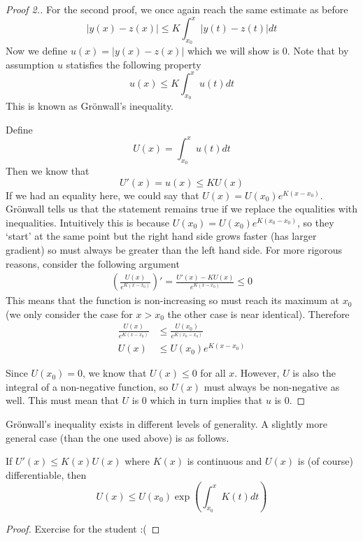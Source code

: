 \begin{proof}[Proof 2.]
    For the second proof, we once again reach the same estimate as before
    $$ |y(x) - z(x)| \leq K \int_{x_0}^{x} |y(t) - z(t)| dt $$
    Now we define $u(x) = |y(x) - z(x)|$ which we will show is 0. Note that by assumption $u$ statisfies the following property
    $$ u(x) \leq K \int_{x_0}^{x} u(t)dt $$
    This is known as Grönwall's inequality.
    
    Define 
    $$ U(x) = \int_{x_0}^{x} u(t) dt $$
    Then we know that
    $$ U'(x) = u(x) \leq KU(x)$$
    If we had an equality here, we could say that $U(x) = U(x_0) e^{K(x - x_0)}$. Grönwall tells us that the statement remains true if we replace the equalities with inequalities. Intuitively this is because $U(x_0) = U(x_0)e^{K(x_0 - x_0)}$, so they `start' at the same point but the right hand side grows faster (has larger gradient) so must always be greater than the left hand side. For more rigorous reasons, consider the following argument
\begin{align*}
    \left( \frac{U(x)}{e^{K(x - x_0)}} \right)' = \frac{U'(x) - K U(x)}{e^{K(x - x_0)}} \leq 0
\end{align*}
    This means that the function is non-increasing so must reach its maximum at $x_0$ (we only consider the case for $x > x_0$ the other case is near identical). Therefore
    \begin{align*}
        \frac{U(x)}{e^{K(x - x_0)}} &\leq \frac{U(x_0)}{e^{K(x_0 - x_0)}}\\
        U(x) &\leq U(x_0) e^{K(x - x_0)}
    \end{align*}
    
    Since $U(x_0) = 0$, we know that $U(x) \leq 0$ for all $x$. However, $U$ is also the integral of a non-negative function, so $U(x)$ must always be non-negative as well. This must mean that $U$ is 0 which in turn implies that $u$ is 0.
\end{proof}

Grönwall's inequality exists in different levels of generality. A slightly more general case (than the one used above) is as follows.
\begin{theorem}\label{thm:easy-gronwall}
If $U'(x) \leq K(x) U(x)$ where $K(x)$ is continuous and $U(x)$ is (of course) differentiable, then
$$ U(x) \leq U(x_0) \exp \left( \int_{x_0}^{x} K(t) dt \right) $$
\end{theorem}
\begin{proof}
    Exercise for the student :(
\end{proof}


